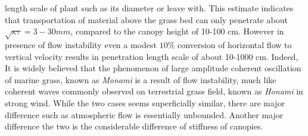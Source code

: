 \documentclass[12pt]{report}   %
\begin{document}
length scale of plant such as its diameter or leave with. This estimate indicates that transportation of material above the grass bed can only penetrate about $\sqrt{\kappa \tau} = 3-30 mm $, compared to the canopy height of 10-100 cm. However in presence of flow instability even a modest $10\%$ conversion of horizontal flow to vertical velocity results in penetration length scale of about 10-1000 cm. Indeed, It is widely believed that the phenomenon of large amplitude coherent oscillation of marine grass, known as \textit{Monami} is a result of flow instability, much like coherent waves commonly observed on terrestrial grass field, known as \textit{Honami} in strong wind. While the two cases seems superficially similar, there are major difference such as atmospheric flow is essentially unbounded. Another major difference the two is the considerable difference of stiffness of canopies.
\newline
\end{document}
